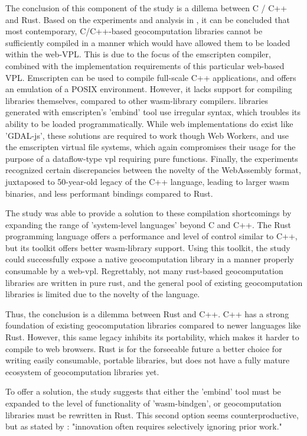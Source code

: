 The conclusion of this component of the study is a dillema between C / C++ and Rust.
Based on the experiments and analysis in , it can be concluded that most contemporary, C/C++-based geocomputation libraries cannot be sufficiently compiled in a manner which would have allowed them to be loaded within the web-VPL.    
This is due to the focus of the emscripten compiler, combined with the implementation requirements of this particular web-based VPL.
Emscripten can be used to compile full-scale C++ applications, and offers an emulation of a POSIX environment.
However, it lacks support for compiling libraries themselves, compared to other wasm-library compilers.
libraries generated with emscripten's 'embind' tool use irregular syntax, which troubles its ability to be loaded programmatically.
While web implementations do exist like 'GDAL-js', these solutions are required to work though Web Workers, and use the emscripten virtual file systems, which again compromises their usage for the purpose of a dataflow-type vpl requiring pure functions.
Finally, the experiments recognized certain discrepancies between the novelty of the WebAssembly format, juxtaposed to 50-year-old legacy of the C++ language, leading to larger wasm binaries, and less performant bindings compared to Rust.

The study was able to provide a solution to these compilation shortcomings by expanding the range of 'system-level languages' beyond C and C++. 
The Rust programming language offers a performance and level of control similar to C++, but its  toolkit offers better wasm-library support. 
Using this toolkit, the study could successfully expose a native geocomputation library in a manner properly consumable by a web-vpl.
Regrettably, not many rust-based geocomputation libraries are written in pure rust, and the general pool of existing geocomputation libraries is limited due to the novelty of the language. 

Thus, the conclusion is a dilemma between Rust and C++.
C++ has a strong foundation of existing geocomputation libraries compared to newer languages like Rust.  
However, this same legacy inhibits its portability, which makes it harder to compile to web browsers. 
Rust is for the forseeable future a better choice for writing easily consumable, portable libraries, but does not have a fully mature ecosystem of geocomputation libraries yet. 

To offer a solution, the study suggests that either the 'embind' tool must be expanded to the level of functionality of 'wasm-bindgen', or geocomputation libraries must be rewritten in Rust. 
This second option seems counterproductive, but as stated by \citet{ammann_maplibre-rs_2022}: "innovation often requires selectively ignoring prior work."

